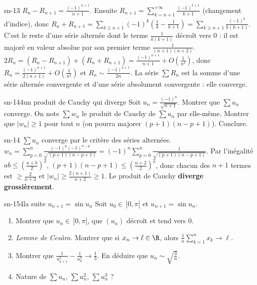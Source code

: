 \begin{corrige}{sn-13}
 $R_n-R_{n+1}=\frac{(-1)^{n+1}}{n+1}$. Ensuite $R_{n+1}=\sum_{k=n+1}^{+\infty}\frac{(-1)^{k+1}}{k+1}$ (changement d'indice), donc
$R_n+R_{n+1}=\sum_{k\geq n+1}(-1)^k\left(\frac1k-\frac1{k+1}\right)=\sum_{k\geq n+1}\frac{(-1)^k}{k(k+1)}$. C'est le reste d'une série alternée dont le
terme $\frac1{k(k+1)}$ décroît vers $0$ : il est majoré en valeur absolue par son premier terme $\frac1{(n+1)(n+2)}$.
 $2R_n=(R_n-R_{n+1})+(R_n+R_{n+1})=\frac{(-1)^{n+1}}{n+1}+O\left(\frac1{n^2}\right)$, donc $R_n=\frac{(-1)^{n+1}}{2(n+1)}+O\left(\frac1{n^2}\right)$ et
$R_n\sim\frac{(-1)^{n+1}}{2n}$. La série $\sum R_n$ est la somme d'une série alternée convergente et d'une série absolument convergente :
elle converge.
\end{corrige}

\begin{exo}{sn-14}{4}{un produit de Cauchy qui diverge}
Soit $u_n=\frac{(-1)^n}{\sqrt{n+1}}$. Montrer que $\sum u_n$ converge. On note $\sum w_n$ le produit de Cauchy de $\sum u_n$ par elle-même.
Montrer que $|w_n|\geq1$ pour tout $n$ (on pourra majorer $(p+1)(n-p+1)$). Conclure.
\end{exo}

\begin{corrige}{sn-14}
$\sum u_n$ converge par le critère des séries alternées. $w_n=\sum_{p=0}^n\frac{(-1)^p(-1)^{n-p}}{\sqrt{(p+1)(n-p+1)}}=(-1)^n\sum_{p=0}^n\frac1{\sqrt{(p+1)(n-p+1)}}$.
Par l'inégalité $ab\leq\left(\frac{a+b}2\right)^2$, $(p+1)(n-p+1)\leq\left(\frac{n+2}2\right)^2$, donc chacun des $n+1$ termes est
$\geq\frac2{n+2}$ et $|w_n|\geq\frac{2(n+1)}{n+2}\geq1$. Le produit de Cauchy \textbf{diverge grossièrement}.
\end{corrige}

\begin{exo}{sn-15}{4}{la suite $u_{n+1}=\sin u_n$}
Soit $u_0\in\,]0,\pi[$ et $u_{n+1}=\sin u_n$.
\begin{enumerate}
\item Montrer que $u_n\in\,]0,\pi[$, que $(u_n)$ décroît et tend vers $0$.
\item \emph{Lemme de Cesàro.} Montrer que si $x_n\to\ell\in\R$, alors $\frac1n\sum_{k=1}^nx_k\to\ell$.
\item Montrer que $\frac1{u_{n+1}^2}-\frac1{u_n^2}\to\frac13$. En déduire que $u_n\sim\sqrt{\frac3n}$.
\item Nature de $\sum u_n$, $\sum u_n^2$, $\sum u_n^3$ ?
\end{enumerate}
\end{exo}

